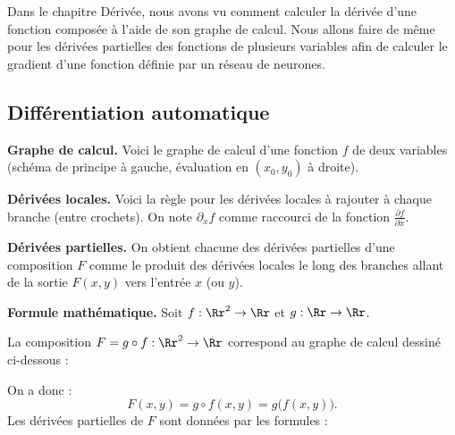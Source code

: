 \documentclass[11pt,class=report,crop=false]{standalone}
\begin{document}

Dans le chapitre \og{}Dérivée\fg{}, nous avons vu comment calculer la dérivée d'une fonction composée à l'aide de son graphe de calcul. Nous allons faire de même pour les dérivées partielles des fonctions de plusieurs variables afin de calculer le gradient d'une fonction définie par un réseau de neurones.

\subsection{Différentiation automatique}

\textbf{Graphe de calcul.}
Voici le graphe de calcul d'une fonction $f$ de deux variables (schéma de principe à gauche, évaluation en $(x_0,y_0)$ à droite).



\bigskip
\textbf{Dérivées locales.}
Voici la règle pour les dérivées locales à rajouter à chaque branche (entre crochets).
On note $\partial_x f$ comme raccourci de la fonction $\frac{\partial f}{\partial x}$.


\bigskip
\textbf{Dérivées partielles.}
On obtient chacune des dérivées partielles d'une composition $F$ comme le produit des dérivées locales le long des branches allant de la sortie $F(x,y)$ vers l'entrée $x$ (ou $y$).


\bigskip
\textbf{Formule mathématique.}
Soit $f : \Rr^2 \to \Rr$ et $g : \Rr \to \Rr$. 

La composition $F = g \circ f : \Rr^2 \to \Rr$ correspond au graphe de calcul dessiné ci-dessous :

On a donc :
$$F(x,y) = g \circ f (x,y) = g \big( f(x,y) \big).$$
Les dérivées partielles de $F$ sont données par les formules :
\end{document}
